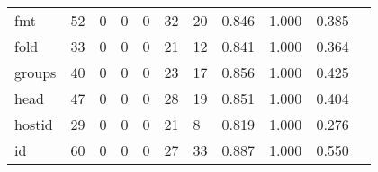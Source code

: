\begin{longtable}{lp{1.20cm}p{1.20cm}p{1.20cm}p{1.20cm}p{1.20cm}p{1.20cm}p{1.20cm}p{1.20cm}p{1.20cm}p{1.20cm}}
fmt       &                                    52 &                                                  0 &                                                  0 &                                                  0 &                                                 32 &                                                 20 &                                         0.846 &                                              1.000 &                                              0.385 \\
fold      &                                    33 &                                                  0 &                                                  0 &                                                  0 &                                                 21 &                                                 12 &                                         0.841 &                                              1.000 &                                              0.364 \\
groups    &                                    40 &                                                  0 &                                                  0 &                                                  0 &                                                 23 &                                                 17 &                                         0.856 &                                              1.000 &                                              0.425 \\
head      &                                    47 &                                                  0 &                                                  0 &                                                  0 &                                                 28 &                                                 19 &                                         0.851 &                                              1.000 &                                              0.404 \\
hostid    &                                    29 &                                                  0 &                                                  0 &                                                  0 &                                                 21 &                                                  8 &                                         0.819 &                                              1.000 &                                              0.276 \\
id        &                                    60 &                                                  0 &                                                  0 &                                                  0 &                                                 27 &                                                 33 &                                         0.887 &                                              1.000 &                                              0.550 \\

\end{longtable}
